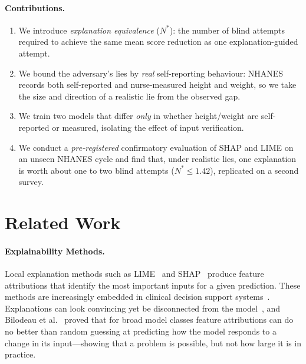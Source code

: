 \documentclass[sigconf,nonacm]{acmart}
\begin{document}
\paragraph{Contributions.}
\begin{enumerate}
  \item We introduce \emph{explanation equivalence} ($N^*$): the
        number of blind attempts required to achieve the same mean
        score reduction as one explanation-guided attempt.
  \item We bound the adversary's lies by \emph{real} self-reporting
        behaviour: NHANES records both self-reported and
        nurse-measured height and weight, so we take the size and
        direction of a realistic lie from the observed gap.
  \item We train two models that differ \emph{only} in whether
        height/weight are self-reported or measured, isolating the
        effect of input verification.
  \item We conduct a \emph{pre-registered} confirmatory evaluation of
        SHAP and LIME on an unseen NHANES cycle and find that, under
        realistic lies, one explanation is worth about one to two blind
        attempts ($N^* \le 1.42$), replicated on a second survey.
\end{enumerate}

\section{Related Work}

\paragraph{Explainability Methods.}
Local explanation methods such as LIME~\cite{ribeiro2016lime} and
SHAP~\cite{lundberg2017shap} produce feature attributions that
identify the most important inputs for a given prediction.  These
methods are increasingly embedded in clinical decision support
systems~\cite{adadi2018peeking}.  Explanations can look convincing
yet be disconnected from the model~\cite{adebayo2018sanity}, and
Bilodeau et al.~\cite{bilodeau2024impossibility} proved that for
broad model classes feature attributions can do no better than random
guessing at predicting how the model responds to a change in its
input---showing that a problem is possible, but not how large it is
in practice.
\end{document}
